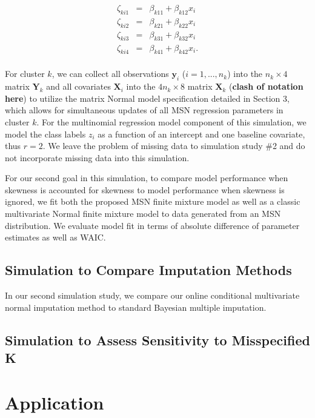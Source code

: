 \documentclass[useAMS,referee]{biom}
\begin{document}
\begin{eqnarray}
	\zeta_{ki1} &=& \beta_{k11} + \beta_{k12}x_i \nonumber \\
	\zeta_{ki2} &=& \beta_{k21} + \beta_{k22}x_i \nonumber \\
	\zeta_{ki3} &=& \beta_{k31} + \beta_{k32}x_i \nonumber \\
	\zeta_{ki4} &=& \beta_{k41} + \beta_{k42}x_i. \nonumber \\
\end{eqnarray}

For cluster $k$, we can collect all observations $\mathbf{y}_i$ ($i = 1,...,n_k$) into the $n_k \times 4$ matrix $\mathbf{Y}_k$ and all covariates $\mathbf{X}_i$ into the $4n_k \times 8$ matrix $\mathbf{X}_k$ (\textbf{clash of notation here}) to utilize the matrix Normal model specification detailed in Section 3, which allows for simultaneous updates of all MSN regression parameters in cluster $k$. For the multinomial regression model component of this simulation, we model the class labels $z_i$ as a function of an intercept and one baseline covariate, thus $r = 2$. We leave the problem of missing data to simulation study \#2 and do not incorporate missing data into this simulation.  

For our second goal in this simulation, to compare model performance when skewness is accounted for skewness to model performance when skewness is ignored, we fit both the proposed MSN finite mixture model as well as a classic multivariate Normal finite mixture model to data generated from an MSN distribution. We evaluate model fit in terms of absolute difference of parameter estimates as well as WAIC. 


\subsection{Simulation to Compare Imputation Methods}

In our second simulation study, we compare our online conditional multivariate normal imputation method to standard Bayesian multiple imputation. 

\subsection{Simulation to Assess Sensitivity to Misspecified K}

\newpage

\section{Application}
\label{s:app}
\end{document}
